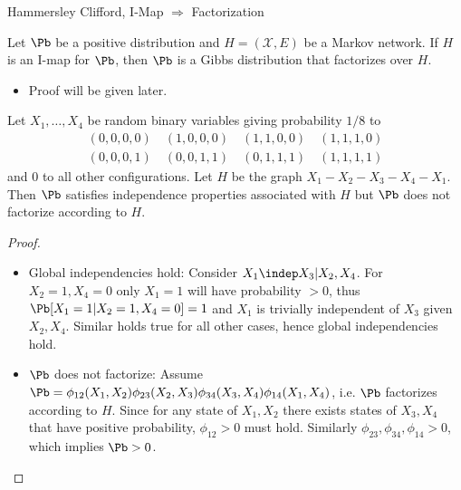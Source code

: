 \begin{frame}{Hammersley Clifford, I-Map $\Rightarrow$ Factorization}
\begin{theorem}
    Let $\Pb$ be a positive distribution and $H = (\mathcal{X},E)$ be a Markov network. If $H$ is an I-map for $\Pb$, then $\Pb$ is a Gibbs distribution that factorizes over $H$.
\end{theorem}
\pause
\begin{itemize}
    \item Proof will be given later.
\end{itemize}
\pause
\begin{example}
Let $X_1,\ldots,X_4$ be random binary variables giving probability $1/8$ to
\begin{equation}
\begin{array}{c}
    (0,0,0,0)\quad(1,0,0,0)\quad(1,1,0,0)\quad(1,1,1,0) \\%
    (0,0,0,1)\quad(0,0,1,1)\quad(0,1,1,1)\quad(1,1,1,1)
\end{array}
\end{equation}
and $0$ to all other configurations.
Let $H$ be the graph $X_1 - X_2 - X_3 - X_4 - X_1$.
Then $\Pb$ satisfies independence properties associated with $H$ but $\Pb$ does not factorize according to $H$.
\end{example}
\begin{proof}
\begin{itemize}
    \pause \item Global independencies hold:
Consider $X_1 \indep X_3 | X_2, X_4$.
\pause
For $X_2 = 1, X_4 = 0$ only $X_1 = 1$ will have probability $>0$, thus $\Pb[X_1 = 1 | X_2=1, X_4=0] = 1$ and $X_1$ is trivially independent of $X_3$ given $X_2,X_4$.
\pause
Similar holds true for all other cases, hence global independencies hold.
\pause
\item $\Pb$ does not factorize:
Assume 
$\Pb = \phi_{12}(X_1,X_2) \phi_{23}(X_2,X_3) \phi_{34}(X_3,X_4) \phi_{14}(X_1,X_4)$, i.e. $\Pb$ factorizes according to $H$.
\pause
Since for any state of $X_1,X_2$ there exists states of $X_3,X_4$ that have positive probability, $\phi_{12} > 0$ must hold.
\pause
Similarly $\phi_{23},\phi_{34},\phi_{14} > 0$, which implies $\Pb > 0$.
\end{itemize}
\end{proof}
\end{frame}

